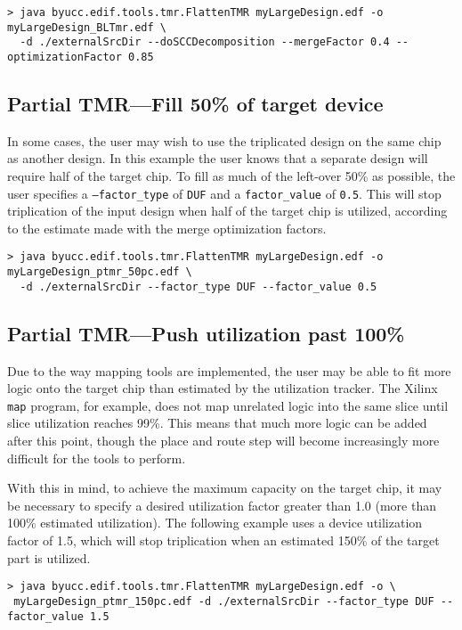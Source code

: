 \documentclass[english]{article}
\begin{document}
\begin{verbatim}
> java byucc.edif.tools.tmr.FlattenTMR myLargeDesign.edf -o myLargeDesign_BLTmr.edf \
  -d ./externalSrcDir --doSCCDecomposition --mergeFactor 0.4 --optimizationFactor 0.85
\end{verbatim}


\subsection{Partial TMR---Fill 50\% of target device}
In some cases, the user may wish to use the triplicated design on the same chip 
as another design. In this example the user knows that a separate design will 
require half of the target chip. To fill as much of the left-over 50\% as 
possible, the user specifies a \texttt{--factor\_type} of \texttt{DUF} and a 
\texttt{factor\_value} of \texttt{0.5}. This will stop triplication of the 
input design when half of the target chip is utilized, according to the 
estimate made with the merge optimization factors.

\begin{verbatim}
> java byucc.edif.tools.tmr.FlattenTMR myLargeDesign.edf -o myLargeDesign_ptmr_50pc.edf \
  -d ./externalSrcDir --factor_type DUF --factor_value 0.5
\end{verbatim}


\subsection{Partial TMR---Push utilization past 100\%}
Due to the way mapping tools are implemented, the user may be able to fit more 
logic onto the target chip than estimated by the utilization tracker. The 
Xilinx \texttt{map} program, for example, does not map unrelated logic into the 
same slice until slice utilization reaches 99\%. This means that much more 
logic can be added after this point, though the place and route step will 
become increasingly more difficult for the tools to perform.

With this in mind, to achieve the maximum capacity on the target chip, it may 
be necessary to specify a desired utilization factor greater than 1.0 (more 
than 100\% estimated utilization). The following example uses a device 
utilization factor of 1.5, which will stop triplication when an estimated 150\% 
of the target part is utilized.

\begin{verbatim}
> java byucc.edif.tools.tmr.FlattenTMR myLargeDesign.edf -o \
 myLargeDesign_ptmr_150pc.edf -d ./externalSrcDir --factor_type DUF --factor_value 1.5
\end{verbatim}
\end{document}
